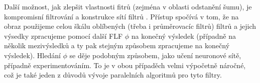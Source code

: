         Další možnost, jak zlepšit vlastnosti fitrů (zejména v oblasti odstanění šumu), je kompromisní filtrování a konstrukce sítí filtrů \cite{Compromise denoise,Minmax denoise}. Přístup spočívá v tom, že na obraz použijeme celou škálu oblíbených (třeba i průměrovacíc filtrů) filtrů a jejich výsedky zpracujeme pomocí další FLF $\phi$ na konečný výsledek (případně na několik mezivýsledků a ty pak stejným způsobem zpracujeme na konečný výsledek). Hledání $\phi$ se děje podobným způsobem, jako učení neuronové sítě, případně experimentováním. To je v obou případěch velmi výpočetně náročné, což je také jeden z důvodů vývoje paralelních algoritmů pro tyto filtry.



